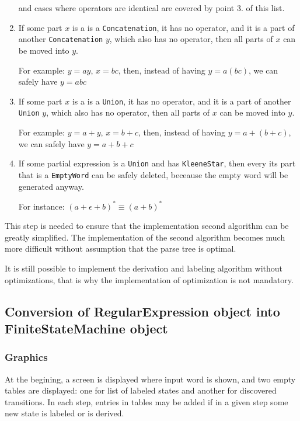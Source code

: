 \documentclass{article}
\begin{document}
\begin{enumerate}
  \vspace{10pt}
  and cases where operators are identical are covered by point 3. of this list.

  \item If some part $x$ is a is a \verb|Concatenation|, it has no operator, and it is a part of
  another \verb|Concatenation| $y$, which also has no operator, then all parts of $x$ can be moved
  into $y$.

  For example: $y = ay$, $x = bc$, then, instead of having $y = a(bc)$, we can safely have $y = abc$

  \item If some part $x$ is a is a \verb|Union|, it has no operator, and it is a part of another
  \verb|Union| $y$, which also has no operator, then all parts of $x$ can be moved into $y$.

  For example: $y = a+y$, $x = b+c$, then, instead of having $y = a+(b+c)$, we can safely have $y =
  a+b+c$

  \item If some partial expression is a \verb|Union| and has \verb|KleeneStar|, then every its part
  that is a \verb|EmptyWord| can be safely deleted, beceause the empty word will be generated
  anyway.

  For instance: $(a+\epsilon+b)^* \equiv (a+b)^*$

\end{enumerate}

This step is needed to ensure that the implementation second algorithm can be greatly simplified.
The implementation of the second algorithm becomes much more difficult without assumption that the
parse tree is optimal.

It is still possible to implement the derivation and labeling algorithm without optimizations, that
is why the implementation of optimization is not mandatory.

\newpage

\subsection{Conversion of RegularExpression object into FiniteStateMachine object}

\subsubsection{Graphics}

At the begining, a screen is displayed where input word is shown, and two empty tables are
displayed: one for list of labeled states and another for discovered transitions. In each step,
entries in tables may be added if in a given step some new state is labeled or is derived.
\end{document}
